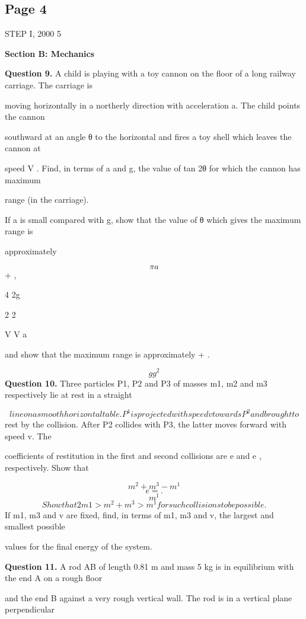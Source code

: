 \documentclass[12pt]{article}
\begin{document}
\subsection*{Page 4}
\begin{flushleft}
STEP I, 2000 5\par
\bigskip\textbf{Section B: Mechanics}\par
\bigskip\textbf{Question 9.} A child is playing with a toy cannon on the floor of a long railway carriage. The carriage is\par
moving horizontally in a northerly direction with acceleration a. The child points the cannon\par
southward at an angle θ to the horizontal and fires a toy shell which leaves the cannon at\par
speed V . Find, in terms of a and g, the value of tan 2θ for which the cannon has maximum\par
range (in the carriage).\par
If a is small compared with g, show that the value of θ which gives the maximum range is\par
approximately\par
\[\pi a\]
+ ,\par
4 2g\par
2 2\par
V V a\par
and show that the maximum range is approximately + .\par
\[g g^2\]
\bigskip\textbf{Question 10.} Three particles P1, P2 and P3 of masses m1, m2 and m3 respectively lie at rest in a straight\par
\[line on a smooth horizontal table. P^1 is projected with speed v towards P^2 and brought to\]
rest by the collision. After P2 collides with P3, the latter moves forward with speed v. The\par
coefficients of restitution in the first and second collisions are e and e , respectively. Show that\par
\[m^2 + m^3 - m^1\]
\[e = .\]
\[m^1\]
\[Show that 2m1 > m^2 + m^3 > m^1 for such collisions to be possible.\]
If m1, m3 and v are fixed, find, in terms of m1, m3 and v, the largest and smallest possible\par
values for the final energy of the system.\par
\bigskip\textbf{Question 11.} A rod AB of length 0.81 m and mass 5 kg is in equilibrium with the end A on a rough floor\par
and the end B against a very rough vertical wall. The rod is in a vertical plane perpendicular\par

\end{flushleft}
\end{document}
